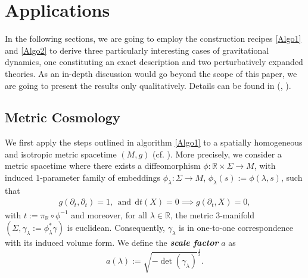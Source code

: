 \documentclass[%
preprint,
titlepage,
nofootinbib,
amsmath,amssymb,
showkeys,
aps,
prd,
floatfix,
]{revtex4-2}
\begin{document}
\section{Applications}\label{chapter4}
In the following sections, we are going to employ the construction recipes \ref{Algo1} and \ref{Algo2}
to derive three particularly interesting cases of gravitational dynamics, one constituting an  exact description and two perturbatively expanded theories.
As an in-depth discussion would go beyond the scope of this paper, we are going to present the results only qualitatively. Details can be found in (\cite{TobiMaster}, \cite{NilsPHD}).

\subsection{Metric Cosmology}\label{cosmo}
We first apply the steps outlined in algorithm \ref{Algo1} to a spatially homogeneous and isotropic metric
spacetime $(M, g)$ (cf. \cite{Wald}).
More precisely, we consider a metric spacetime where there exists a diffeomorphism $\phi : \mathbb{R} \times \Sigma \rightarrow M$, with induced $1$-parameter family of embeddings $\phi_{\lambda}: \Sigma \rightarrow M$, $\phi_{\lambda}(s):=\phi(\lambda,s)$, such that
\begin{align}
g(\partial_t, \partial_t) = 1, \ \  \text{and} \ \ \mathrm dt(X) = 0 \implies  g(\partial_t, X) = 0,   
\end{align}
with $t := \pi_{\mathbb{R}} \circ \phi^{-1}$ and moreover,
for all $\lambda \in \mathbb{R}$, the metric $3$-manifold $(\Sigma, \gamma_{\lambda}:= \phi_{\lambda}^{\ast} \gamma)$ is euclidean.
Consequently, $\gamma_{\lambda}$ is in one-to-one correspondence with its induced volume form. We define the \textbf{\textit{scale factor}} $a$ as
\begin{equation}
    a(\lambda) := \sqrt{-\operatorname{det}(\gamma_{\lambda})}^\frac{1}{3}.
\end{equation}
\end{document}
